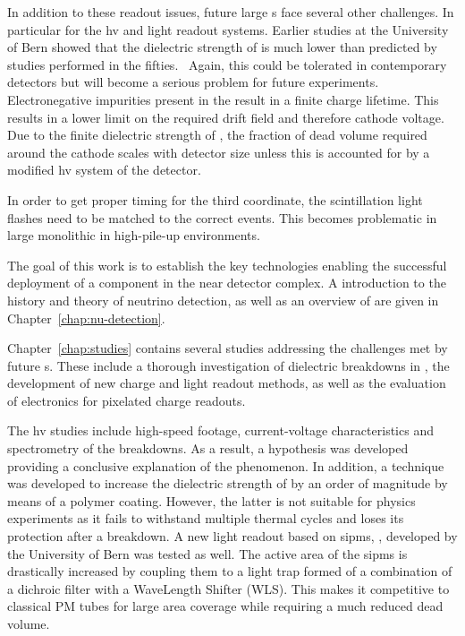 In addition to these readout issues, future large \lartpc{}s face several other challenges.
In particular for the \gls{hv} and light readout systems.
Earlier studies at the University of Bern showed that the dielectric strength of \lar{} is much lower than predicted by studies performed in the fifties.~\cite{breakdown_14, swan1, swan2}
Again, this could be tolerated in contemporary detectors but will become a serious problem for future experiments.
Electronegative impurities present in the \lar{} result in a finite charge lifetime.
This results in a lower limit on the required drift field and therefore cathode voltage.
Due to the finite dielectric strength of \lar{}, the fraction of dead volume required around the cathode scales with detector size unless this is accounted for by a modified \gls{hv} system of the detector.

In order to get proper timing for the third coordinate, the scintillation light flashes need to be matched to the correct events.
This becomes problematic in large monolithic \lartpc{} in high-pile-up environments.

The goal of this work is to establish the key technologies enabling the successful deployment of a \lartpc{} component in the \dune{} near detector complex.
A introduction to the history and theory of neutrino detection, as well as an overview of \dune{} are given in Chapter~\ref{chap:nu-detection}.

Chapter~\ref{chap:studies} contains several studies addressing the challenges met by future \lartpc{}s.
These include a thorough investigation of dielectric breakdowns in \lar{}, the development of new charge and light readout methods, as well as the evaluation of electronics for pixelated charge readouts.

The \gls{hv} studies include high-speed footage, current-voltage characteristics and spectrometry of the breakdowns.
As a result, a hypothesis was developed providing a conclusive explanation of the phenomenon.
In addition, a technique was developed to increase the dielectric strength of \lar{} by an order of magnitude by means of a polymer coating.
However, the latter is not suitable for physics experiments as it fails to withstand multiple thermal cycles and loses its protection after a breakdown.
A new light readout based on \glspl{sipm}, \AL{}, developed by the University of Bern was tested as well.
The active area of the \glspl{sipm} is drastically increased by coupling them to a light trap formed of a combination of a dichroic filter with a WaveLength Shifter (WLS).
This makes it competitive to classical PM tubes for large area coverage while requiring a much reduced dead volume.

